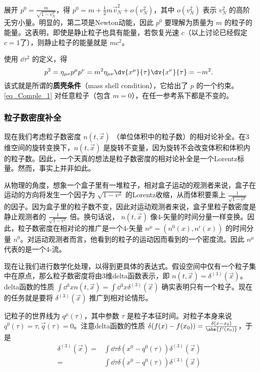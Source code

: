 展开 $p^0=\frac{m}{\sqrt{1-v_N^2}}$，得 $p^0=m+\frac{1}{2}m\vec v_N^2+o(v_N^2)$，其中 $o(v_N^2)$ 表示 $v_N^2$ 的高阶无穷小量。明显的，第二项是Newton动能，因此 $p^0$ 要理解为质量为 $m$ 的粒子的能量。这表明，即使是静止粒子也具有能量，若恢复光速 $c$（以上讨论已经假定 $c=1$了），则静止粒子的能量就是 $mc^2$。

使用 $\dd\tau^2$ 的定义，得
\begin{equation}\label{eq_Comple_1}
p^2=\eta_{\mu\nu}p^\mu p^\nu=m^2\eta_{\mu\nu}\dv{x^\mu}{\tau}\dv{x^\nu}{\tau}=-m^2.~
\end{equation}
该式就是所谓的\textbf{质壳条件}（mass shell condition），它给出了 $p$ 的一个约束。\autoref{eq_Comple_1} 对任意粒子（包含 $m=0$），在任一参考系下都是不变的。


\subsubsection{粒子数密度补全}

现在我们考虑粒子数密度 $n(t,\vec x)$ （单位体积中的粒子数）的相对论补全。在3维空间的旋转变换下，$n(t,\vec x)$ 是旋转不变量，因为旋转不会改变体积和体积内的粒子数。因此，一个天真的想法是粒子数密度的相对论补全是一个Lorentz标量。然而，事实上并非如此。

从物理的角度，想象一个盒子里有一堆粒子，相对盒子运动的观测者来说，盒子在运动的方向将发生一个因子为 $\sqrt{1-v^2}$ 的Lorentz收缩，从而体积要乘上 $\frac{1}{\sqrt{1-v^2}}$ 的因子。因为盒子里的粒子数不变，因此对运动观测者来说，盒子里粒子数密度是静止观测者的 $\frac{1}{\sqrt{1-v^2}}$ 倍。换句话说， $n(t,\vec x)$ 像4-矢量的时间分量一样变换。因此，粒子数密度在相对论的推广是一个4-矢量 $n^\mu=(n^0(x),n^i(x))$ 的时间分量 $n^0$。对运动观测者而言，他看到的粒子的运动因而看到的一个密度流。因此 $n^\mu$ 代表的是一个4-流。

现在让我们进行数学化处理，以得到更具体的表达式。假设空间中仅有一个粒子集中在原点，那么粒子数密度将由3维delta函数表示，即 $n(t,\vec x)=\delta^{(3)}(\vec x)$。delta函数的性质 $\int\dd{^3} xn(t,\vec x)=\int\dd{^3} x\delta^{(3)}(\vec x)$ 确实表明只有一个粒子。现在的任务就是要将 $\delta^{(3)}(\vec x)$ 推广到相对论情形。

记粒子的世界线为 $q^\mu(\tau)$，其中参数 $\tau$ 是粒子本征时间。对粒子本身来说 $q^0(\tau)=\tau,\vec q(\tau)=0$。注意delta函数的性质 $\delta(f(x)-f(x_0))=\frac{\delta(x-x_0)}{\abs{f'(x_0)}}$，于是
\begin{equation}
\begin{aligned}
\delta^{(3)}(\vec x)=&\int\dd \tau\delta(x^0-q^0(\tau))\delta^{(3)}(\vec x)\\
=&\int\dd \tau\delta(x^0-q^0(\tau))\delta^{(3)}(\vec x)
\end{aligned}~
\end{equation}





















